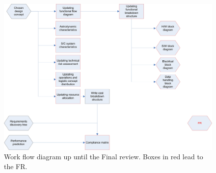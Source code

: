 \begin{figure}[H]
\begin{center}
\includegraphics[width=1.2\textwidth, angle=90]{chapters/img/Workflow_diagram_FR.jpg}
\end{center}
\caption{Work flow diagram up until the Final review. Boxes in red lead to the FR.}
\label{wfdfinal}
\end{figure}